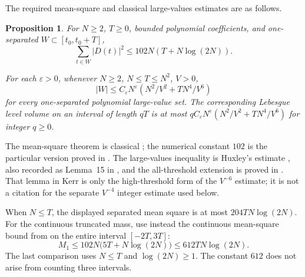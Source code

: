 \documentclass[11pt,a4paper,oneside]{article}
\newtheorem{proposition}[theorem]{Proposition}
\theoremstyle{definition}
\newcommand{\eps}{\varepsilon}
\numberwithin{equation}{section}
\begin{document}
The required mean-square and classical large-values estimates are as follows.
\begin{proposition}\label{input:classical}
For $N\ge2$, $T\ge0$, bounded polynomial coefficients, and one-separated
$W\subset[t_0,t_0+T]$,
\[
 \sum_{t\in W}|D(t)|^2\le102N(T+N\log(2N)).
\]

For each $\eps>0$, whenever $N\ge2$, $N\le T\le N^2$, $V>0$,
\begin{equation}\label{eq:classical}
 |W|\le C_\eps N^\eps\left(N^2/V^2+TN^4/V^6\right)
\end{equation}
for every one-separated polynomial large-value set. The corresponding Lebesgue
level volume on an interval of length $qT$ is at most
$qC_\eps N^\eps(N^2/V^2+TN^4/V^6)$ for integer $q\ge0$.

\end{proposition}
The mean-square theorem is classical \cite{IwaniecKowalski}; the numerical constant $102$ is the particular version proved in \cite{Lewko}. The large-values inequality is Huxley's estimate \cite{Huxley}, also recorded as Lemma~15 in \cite{Kerr}, and the all-threshold extension is proved in \cite{Lewko}. That lemma in Kerr is only the high-threshold form of the $V^{-6}$ estimate; it is not a citation for the separate $V^{-4}$ integer estimate used below.

When $N\le T$, the displayed separated mean square is at most $204TN\log(2N)$. For the continuous truncated mass, use instead the continuous mean-square bound from \cite{Lewko} on the entire interval $[-2T,3T]$:
\[
 M_1\le102N\bigl(5T+N\log(2N)\bigr)
 \le612TN\log(2N).
\]
The last comparison uses $N\le T$ and $\log(2N)\ge1$. The constant $612$ does not arise from counting three intervals.
\end{document}
